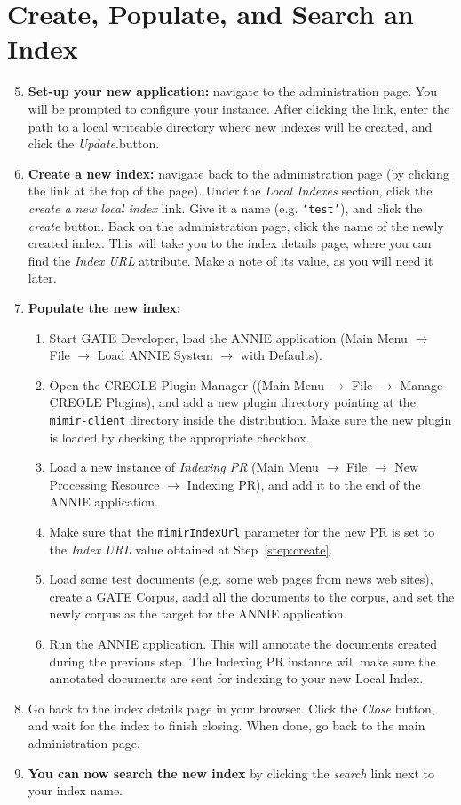\section{Create, Populate, and Search an Index}
%
\begin{enumerate}
\setcounter{enumi}{4}
  \item {\bf Set-up your new \Mimir{} application:}
  navigate to the administration page. You will be prompted to configure your \Mimir{} instance.
  After clicking the link, enter the path to a local writeable directory
  where new indexes will be created, and click the {\em Update}.button.
  \item \label{step:create} {\bf Create a new index:} navigate back to the
  administration page (by clicking the link at the top of the page). Under the {\em Local Indexes}
  section, click the {\em create a new local index} link. Give it a name (e.g.
  {\tt `test'}), and click the {\em create} button. Back on the administration
  page, click the name of the newly created index. This will take you to the
  index details page, where you can find the {\em Index URL} attribute. Make a
  note of its value, as you will need it later.
  \item {\bf Populate the new index:} 
  \begin{enumerate}
    \item Start GATE Developer, load the ANNIE application (Main Menu 
    $\rightarrow$ File $\rightarrow$ Load ANNIE System $\rightarrow$ with
    Defaults).
    \item Open the CREOLE Plugin Manager ((Main Menu $\rightarrow$ File
    $\rightarrow$ Manage CREOLE Plugins), and add a new plugin directory
    pointing at the {\tt mimir-client} directory inside the \Mimir{}
    distribution. Make sure the new plugin is loaded by checking the
    appropriate checkbox.
    \item Load a new instance of {\em \Mimir{} Indexing PR} (Main Menu
    $\rightarrow$ File $\rightarrow$ New Processing Resource $\rightarrow$
    \Mimir{} Indexing PR), and add it to the end of the ANNIE application.
    \item Make sure that the {\tt mimirIndexUrl} parameter for the new PR is set
    to the {\em Index URL} value obtained at Step~\ref{step:create}.
    \item Load some test documents (e.g. some web pages from news web sites),
    create a GATE Corpus, aadd all the documents to the corpus, and set the
    newly corpus as the target for the ANNIE application.
    \item Run the ANNIE application. This will annotate the documents created
    during the previous step. The \Mimir{} Indexing PR instance will make
    sure the annotated documents are sent for indexing to your new Local Index.
  \end{enumerate}
  \item Go back to the index details page in your browser. Click the {\em Close}
  button, and wait for the index to finish closing. When done, go back to the
  main administration page. 
  \item {\bf You can now search the new index} by clicking the {\em search} link
  next to your index name.
\end{enumerate}